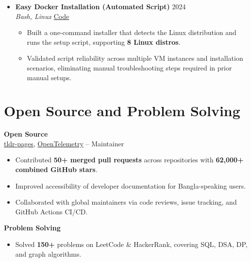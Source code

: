 \documentclass[a4paper]{article}
\newcommand{\resumeItem}[1]{
  \item\small{
    {#1 \vspace{-2pt}}
  }
}
\newcommand{\resumeItemListStart}{\begin{itemize}}
\newcommand{\resumeItemListEnd}{\end{itemize}\vspace{-5pt}}
\newcommand{\subheading}[1]{\noindent \textbf{#1} \\}
\begin{document}
\begin{itemize}[leftmargin=0.15in, label={}, itemsep=3pt]
    \item
    \textbf{Easy Docker Installation (Automated Script)} \hfill 2024\\
    \small\textit{Bash, Linux} \hfill
    \href{https://github.com/badhon495/Easy_Docker_Installation}{Code}
    \vspace{-5pt}
    \resumeItemListStart
      \resumeItem{Built a one-command installer that detects the Linux distribution and runs the setup script, supporting \textbf{8 Linux distros}.}
      \resumeItem{Validated script reliability across multiple VM instances and installation scenarios, eliminating manual troubleshooting steps required in prior manual setups.}
    \resumeItemListEnd

  \end{itemize}




\section{Open Source and Problem Solving}

\small
\subheading{Open Source}
\href{https://github.com/tldr-pages/tldr}{tldr-pages}, \href{https://github.com/open-telemetry}{OpenTelemetry} --
Maintainer
\begin{itemize}[noitemsep, topsep=0pt]
    \item Contributed \textbf{50+ merged pull requests} across repositories with \textbf{62,000+ combined GitHub stars}.
    \item Improved accessibility of developer documentation for Bangla-speaking users.
    \item Collaborated with global maintainers via code reviews, issue tracking, and GitHub Actions CI/CD.
\end{itemize}

\vspace{0.5em}

\subheading{Problem Solving}
\begin{itemize}[noitemsep, topsep=0pt]
\item Solved \textbf{150+} problems on LeetCode \& HackerRank, covering SQL, DSA, DP, and graph algorithms.
\end{itemize}




\end{document}

